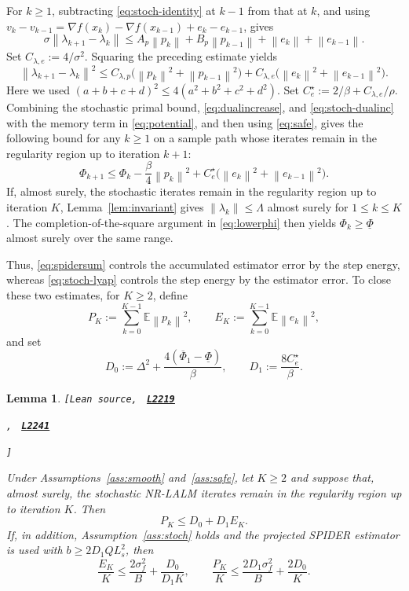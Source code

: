 \documentclass[11pt]{article}
\newtheorem{lemma}[theorem]{Lemma}
\theoremstyle{definition}
\theoremstyle{remark}
\numberwithin{equation}{section}
\numberwithin{figure}{section}
\numberwithin{table}{section}
\numberwithin{algorithm}{section}
\newcommand{\E}{\mathbb{E}}
\newcommand{\norm}[1]{\left\lVert #1\right\rVert}
\newcommand{\grad}{\nabla}
\newcommand{\leanLinkText}[1]{%
  \underline{\textbf{#1}}%
}
\newcommand{\leanDeclTag}[2]{%
  {\footnotesize\texttt{[Lean source, }}%
  \href{https://github.com/optpku/ReasBook/blob/v4.32.2/ReasBook/Papers/TR_LALM_theory/#1?plain=1\#L#2}%
    {\leanLinkText{\footnotesize\texttt{L#2}}}%
}
\newcommand{\leanDeclTagExtra}[2]{%
  \unskip
  {\footnotesize\texttt{, }}%
  \href{https://github.com/optpku/ReasBook/blob/v4.32.2/ReasBook/Papers/TR_LALM_theory/#1?plain=1\#L#2}%
    {\leanLinkText{\footnotesize\texttt{L#2}}}\allowbreak
}
\newcommand{\leanDeclTagEnd}{%
  \unskip
  {\footnotesize\texttt{]}}\enspace
}
\begin{document}
For \(k\ge1\), subtracting \eqref{eq:stoch-identity} at \(k-1\) from that
at \(k\), and using
\(v_k-v_{k-1}
=\grad f(x_k)-\grad f(x_{k-1})+e_k-e_{k-1}\), gives
$$
\sigma\norm{\lambda_{k+1}-\lambda_k}
\le A_p\norm{p_k}+B_p\norm{p_{k-1}}
   +\norm{e_k}+\norm{e_{k-1}}.
$$
Set $C_{\lambda,e}:=4/\sigma^2$.  Squaring the preceding estimate yields
\begin{equation}
\norm{\lambda_{k+1}-\lambda_k}^2
\le C_{\lambda,p}\bigl(\norm{p_k}^2+\norm{p_{k-1}}^2\bigr)
+C_{\lambda,e}\bigl(\norm{e_k}^2+\norm{e_{k-1}}^2\bigr).
\label{eq:stoch-dualinc}
\end{equation}
Here we used $(a+b+c+d)^2\le4(a^2+b^2+c^2+d^2)$. Set \(C_e^\star:=2/\beta+C_{\lambda,e}/\rho\).  Combining the stochastic
primal bound, \eqref{eq:dualincrease}, and \eqref{eq:stoch-dualinc} with the
memory term in \eqref{eq:potential}, and then using \eqref{eq:safe}, gives the following bound for any $k\ge1$ on a sample path whose iterates remain in the regularity region up to iteration $k+1$:
\begin{equation}
    \Phi_{k+1}
    \le \Phi_k-\frac{\beta}{4}\norm{p_k}^2
       +C_e^\star
        \big(\norm{e_k}^2+\norm{e_{k-1}}^2\big).
    \label{eq:stoch-lyap}
\end{equation}
If, almost surely, the stochastic iterates remain in the regularity region up to iteration $K$, Lemma~\ref{lem:invariant} gives $\norm{\lambda_k}\le\Lambda$ almost surely for $1\le k\le K$. The completion-of-the-square argument in \eqref{eq:lowerphi} then yields $\Phi_k\ge\underline\Phi$ almost surely over the same range.

Thus, \eqref{eq:spidersum} controls the accumulated estimator error by the
step energy, whereas \eqref{eq:stoch-lyap} controls the step energy by the
estimator error.  To close these two estimates, for \(K\ge2\), define
$$
P_K:=\sum_{k=0}^{K-1}\E\norm{p_k}^2,
\qquad
E_K:=\sum_{k=0}^{K-1}\E\norm{e_k}^2,
$$
and set
$$
D_0:=\Delta^2+\frac{4(\overline\Phi_1-\underline\Phi)}{\beta},
\qquad
D_1:=\frac{8C_e^\star}{\beta}.
$$

\begin{lemma}
\label{lem:coupled}
\leanDeclTag{Lemma_3_4.lean}{2219}
\leanDeclTagExtra{Lemma_3_4.lean}{2241}
\leanDeclTagEnd
Under Assumptions~\ref{ass:smooth} and~\ref{ass:safe}, let $K\ge2$ and suppose that, almost surely, the stochastic NR-LALM iterates remain in the regularity region up to iteration $K$. Then
$$
P_K\le D_0+D_1E_K.
$$
If, in addition, Assumption~\ref{ass:stoch} holds and the projected SPIDER estimator is used with \(b\ge2D_1QL_s^2\), then
$$
\frac{E_K}{K}
\le\frac{2\sigma_f^2}{B}+\frac{D_0}{D_1K},
\qquad
\frac{P_K}{K}
\le\frac{2D_1\sigma_f^2}{B}+\frac{2D_0}{K}.
$$
\end{lemma}
\end{document}
